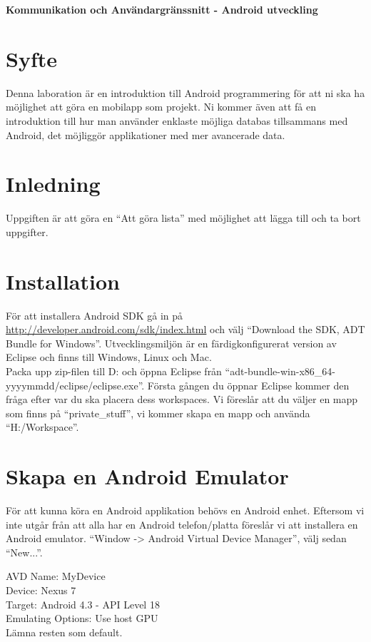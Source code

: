\documentclass[11 pt]{article} %
\begin{document}
\bigskip

\centerline{{\LARGE \bf Kommunikation och Användargränssnitt - Android utveckling}}
\section{Syfte}
Denna laboration är en introduktion till Android programmering för att ni ska ha möjlighet att göra en mobilapp som projekt. 
Ni kommer även att få en introduktion till hur man använder enklaste möjliga databas tillsammans med Android, det möjliggör applikationer med mer avancerade data.
\section{Inledning}
Uppgiften är att göra en “Att göra lista” med möjlighet att lägga till och ta bort uppgifter.
\section{Installation}
För att installera Android SDK gå in på \href{http://developer.android.com/sdk/index.html}{http://developer.android.com/sdk/index.html} och välj “Download the SDK, ADT Bundle for Windows”. Utvecklingsmiljön är en färdigkonfigurerat version av Eclipse och finns till Windows, Linux och Mac.\\

Packa upp zip-filen till D: och öppna Eclipse från “adt-bundle-win-x86\_64-yyyymmdd/eclipse/eclipse.exe”. 
Första gången du öppnar Eclipse kommer den fråga efter var du ska placera dess workspaces. 
Vi föreslår att du väljer en mapp som finns på “private\_stuff”, vi kommer skapa en mapp och använda “H:/Workspace”.

\section{Skapa en Android Emulator}
För att kunna köra en Android applikation behövs en Android enhet. 
Eftersom vi inte utgår från att alla har en Android telefon/platta föreslår vi att installera en Android emulator. 
“Window -> Android Virtual Device Manager”, välj sedan “New...”.

AVD Name: MyDevice\\
Device:  Nexus 7\\
Target:  Android 4.3 - API Level 18\\
Emulating Options:  Use host GPU\\
Lämna resten som default.\\
\end{document}
